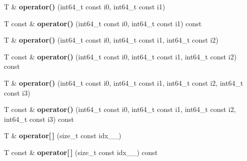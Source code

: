\begin{DoxyCompactItemize}
\item 
\hypertarget{classsddk_1_1mdarray__base_afb64cd2406e427fe7a7896a908ebb68e}{}T \& {\bfseries operator()} (int64\+\_\+t const i0, int64\+\_\+t const i1)\label{classsddk_1_1mdarray__base_afb64cd2406e427fe7a7896a908ebb68e}

\item 
\hypertarget{classsddk_1_1mdarray__base_ad2b7d0ef8ca2cadcb509516d0d8301f9}{}T const \& {\bfseries operator()} (int64\+\_\+t const i0, int64\+\_\+t const i1) const \label{classsddk_1_1mdarray__base_ad2b7d0ef8ca2cadcb509516d0d8301f9}

\item 
\hypertarget{classsddk_1_1mdarray__base_a8357d3070dcd24988ccee0b2c6ea8d8e}{}T \& {\bfseries operator()} (int64\+\_\+t const i0, int64\+\_\+t const i1, int64\+\_\+t const i2)\label{classsddk_1_1mdarray__base_a8357d3070dcd24988ccee0b2c6ea8d8e}

\item 
\hypertarget{classsddk_1_1mdarray__base_a6c5226fbd68e10e68242035e92ff6140}{}T const \& {\bfseries operator()} (int64\+\_\+t const i0, int64\+\_\+t const i1, int64\+\_\+t const i2) const \label{classsddk_1_1mdarray__base_a6c5226fbd68e10e68242035e92ff6140}

\item 
\hypertarget{classsddk_1_1mdarray__base_a86968001c3476a7f45b7a86db4afffc2}{}T \& {\bfseries operator()} (int64\+\_\+t const i0, int64\+\_\+t const i1, int64\+\_\+t const i2, int64\+\_\+t const i3)\label{classsddk_1_1mdarray__base_a86968001c3476a7f45b7a86db4afffc2}

\item 
\hypertarget{classsddk_1_1mdarray__base_ab5550704d5da2280250842da7b19e9b7}{}T const \& {\bfseries operator()} (int64\+\_\+t const i0, int64\+\_\+t const i1, int64\+\_\+t const i2, int64\+\_\+t const i3) const \label{classsddk_1_1mdarray__base_ab5550704d5da2280250842da7b19e9b7}

\item 
\hypertarget{classsddk_1_1mdarray__base_a3a1ddc8c9c2e11265772395ede120773}{}T \& {\bfseries operator\mbox{[}$\,$\mbox{]}} (size\+\_\+t const idx\+\_\+\+\_\+)\label{classsddk_1_1mdarray__base_a3a1ddc8c9c2e11265772395ede120773}

\item 
\hypertarget{classsddk_1_1mdarray__base_a06c30692d3c204e1fa2308af49a32069}{}T const \& {\bfseries operator\mbox{[}$\,$\mbox{]}} (size\+\_\+t const idx\+\_\+\+\_\+) const \label{classsddk_1_1mdarray__base_a06c30692d3c204e1fa2308af49a32069}


\end{DoxyCompactItemize}
